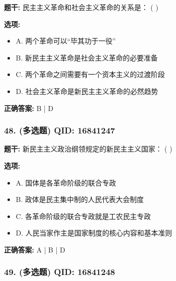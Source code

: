 \documentclass[12pt,UTF8]{ctexart}
\begin{document}
\textbf{题干:}
民主主义革命和社会主义革命的关系是： ( )

\textbf{选项:}
\begin{itemize}[leftmargin=*]

  \item A. 两个革命可以“毕其功于一役”

  \item B. 新民主主义革命是社会主义革命的必要准备

  \item C. 两个革命之间需要有一个资本主义的过渡阶段

  \item D. 社会主义革命是新民主主义革命的必然趋势

\end{itemize}

\textbf{正确答案:}
B | D

\vspace{0.3em}\hrulefill\vspace{0.7em}

\subsubsection*{48. (多选题) \small QID: 16841247}

\textbf{题干:}
新民主主义政治纲领规定的新民主主义国家： ( )

\textbf{选项:}
\begin{itemize}[leftmargin=*]

  \item A. 国体是各革命阶级的联合专政

  \item B. 政体是民主集中制的人民代表大会制度

  \item C. 各革命阶级的联合专政就是工农民主专政

  \item D. 人民当家作主是国家制度的核心内容和基本准则

\end{itemize}

\textbf{正确答案:}
A | B | D

\vspace{0.3em}\hrulefill\vspace{0.7em}

\subsubsection*{49. (多选题) \small QID: 16841248}
\end{document}
